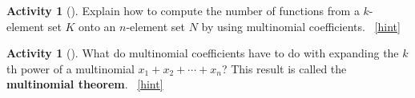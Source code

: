 \documentclass[10pt,]{book}
\newcommand{\terminology}[1]{\textbf{#1}}
\theoremstyle{plain}
\theoremstyle{definition}
\theoremstyle{definition}
\theoremstyle{definition}
\newtheorem{activity}[project]{Activity}
\numberwithin{equation}{chapter}
\begin{document}
\begin{activity}[]\label{activity-276}
\hypertarget{p-1437}{}%
Explain how to compute the number of functions from a \(k\)-element set \(K\) onto an \(n\)-element set \(N\) by using multinomial coefficients.%
~\hfill{\tiny\hyperlink{a-283}{[hint]}\hypertarget{q-283}{}}\end{activity}
\begin{activity}[]\label{activity-277}
\hypertarget{p-1440}{}%
What do multinomial coefficients have to do with expanding the \(k\)th power of a multinomial \(x_1+x_2+\cdots+x_n\)? This result is called the \terminology{multinomial theorem}.%
~\hfill{\tiny\hyperlink{a-284}{[hint]}\hypertarget{q-284}{}}\end{activity}
\typeout{************************************************}
\typeout{************************************************}
\end{document}
